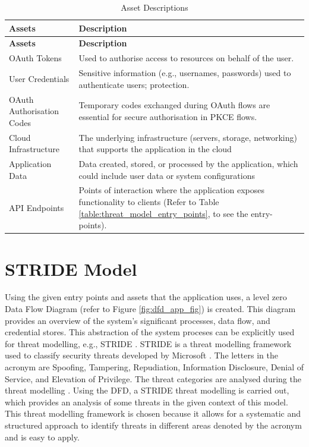 \begin{longtable}{|p{8cm}|p{8cm}|}
\caption{Asset Descriptions}
\label{table:threat_model_assets}
\hline
\rowcolor{grey!15}
\textbf{Assets} & \textbf{Description} \\
\hline
\endfirsthead

\hline
\rowcolor{grey!15}
\textbf{Assets} & \textbf{Description} \\
\hline
\endhead

OAuth Tokens & Used to authorise access to resources on behalf of the user. \\
\hline
User Credentials & Sensitive information (e.g., usernames, passwords) used to authenticate users; protection. \\
\hline
OAuth Authorisation Codes & Temporary codes exchanged during OAuth flows are essential for secure authorisation in PKCE flows. \\
\hline
Cloud Infrastructure & The underlying infrastructure (servers, storage, networking) that supports the application in the cloud \\
\hline
Application Data & Data created, stored, or processed by the application, which could include user data or system configurations \\
\hline
API Endpoints & Points of interaction where the application exposes functionality to clients (Refer to Table \ref{table:threat_model_entry_points}, to see the entry-points). \\
\hline

\end{longtable}


\section{STRIDE Model}
Using the given entry points and assets that the application uses, a level zero Data Flow Diagram (refer to Figure \ref{fig:dfd_app_fig}) is created.
This diagram provides an overview of the system's significant processes, data flow, and credential stores.
This abstraction of the system proceses can be explicitly used for threat modelling, e.g., STRIDE \citep{dfd_stride}.
STRIDE is a threat modelling framework used to classify security threats developed by Microsoft \citep{stride_usage}.
The letters in the acronym are Spoofing, Tampering, Repudiation, Information Disclosure, Denial of Service, and Elevation of Privilege.
The threat categories are analysed during the threat modelling \citep{stride}.
Using the DFD, a STRIDE threat modelling is carried out, which provides an analysis of some threats in the given context of this model.
This threat modelling framework is chosen because it allows for a systematic and structured approach to identify threats in different areas denoted by the acronym and is easy to apply.



